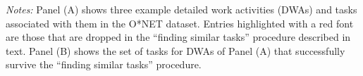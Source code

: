 \begin{landscape}
\begin{table}[p]
\caption{Example DWAs with Tasks in Multiple Occupations and the Tasks Surviving the ``Finding Similar Tasks'' Procedure}
\label{tab:DWA_tasks}


\vspace{0.3cm}

\footnotesize{\emph{Notes:} Panel (A) shows three example detailed work activities (DWAs) and tasks associated with them in the O*NET dataset. 
Entries highlighted with a red font are those that are dropped in the ``finding similar tasks'' procedure described in text. 
Panel (B) shows the set of tasks for DWAs of Panel (A) that successfully survive the ``finding similar tasks'' procedure.}
\end{table}
\end{landscape}
